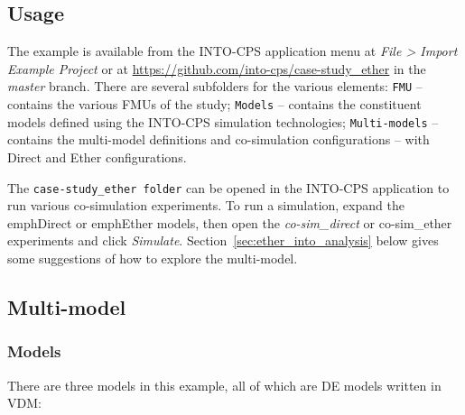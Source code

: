 \subsection{Usage}
\label{sec:ether_usage}

The example is available from the INTO-CPS application menu at \emph{File > Import Example Project} or at  \url{https://github.com/into-cps/case-study\_ether} in the \emph{master} branch. There are several subfolders for the various elements: \texttt{FMU} -- contains the various FMUs of the study; \texttt{Models} -- contains the constituent models defined using the INTO-CPS simulation technologies; \texttt{Multi-models} -- contains the multi-model definitions and co-simulation configurations -- with Direct and Ether configurations.

The \texttt{case-study\_ether folder} can be opened in the INTO-CPS application to run various co-simulation experiments. To run a simulation, expand the emph{Direct} or emph{Ether} models, then open the \emph{co-sim\_direct} or {co-sim\_ether} experiments and click \emph{Simulate}. Section~\ref{sec:ether_into_analysis} below gives some suggestions of how to explore the multi-model.




\subsection{Multi-model}
\label{sec:ether_into_mm}

\subsubsection{Models}

There are three models in this example, all of which are DE models written in VDM:

